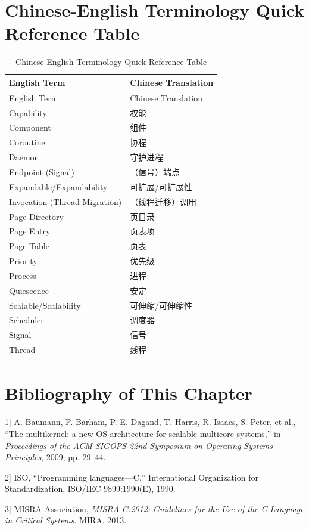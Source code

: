 \section{Chinese-English Terminology Quick Reference Table}\label{sec:9-terminology-translation-table}

\begin{xltabular}{\textwidth}{@{}>{\hsize\raggedright\arraybackslash}X>{\hsize\raggedright\arraybackslash}X@{}}
\caption{Chinese-English Terminology Quick Reference Table}\label{tab:9-8-terminology-translation}\\
\toprule
English Term & Chinese Translation\tabularnewline
\endfirsthead
\toprule
English Term & Chinese Translation\tabularnewline
\midrule
\endhead
\bottomrule
\endlastfoot
Capability & 权能\tabularnewline
Component & 组件\tabularnewline
Coroutine & 协程\tabularnewline
Daemon & 守护进程\tabularnewline
Endpoint (Signal) & （信号）端点\tabularnewline
Expandable/Expandability & 可扩展/可扩展性\tabularnewline
Invocation (Thread Migration) & （线程迁移）调用\tabularnewline
Page Directory & 页目录\tabularnewline
Page Entry & 页表项\tabularnewline
Page Table & 页表\tabularnewline
Priority & 优先级\tabularnewline
Process & 进程\tabularnewline
Quiescence & 安定\tabularnewline
Scalable/Scalability & 可伸缩/可伸缩性\tabularnewline
Scheduler & 调度器\tabularnewline
Signal & 信号\tabularnewline
Thread & 线程\tabularnewline
\end{xltabular}
\nopagebreak[4]

\section{Bibliography of This Chapter}\label{sec:9-bibliography}

\protect{}\label{cite:9-1}

\noindent {[}1{]} A. Baumann, P. Barham, P.-E. Dagand, T. Harris, R. Isaacs, S. Peter, et al., ``The multikernel: a new OS architecture for scalable multicore systems,'' in \textit{Proceedings of the ACM SIGOPS 22nd Symposium on Operating Systems Principles}, 2009, pp. 29--44.

\protect{}\label{cite:9-2}

\noindent {[}2{]} ISO, ``Programming languages---C,'' International Organization for Standardization, ISO/IEC 9899:1990(E), 1990.

\protect{}\label{cite:9-3}

\noindent {[}3{]} MISRA Association, \textit{MISRA C:2012: Guidelines for the Use of the C Language in Critical Systems}. MIRA, 2013.


